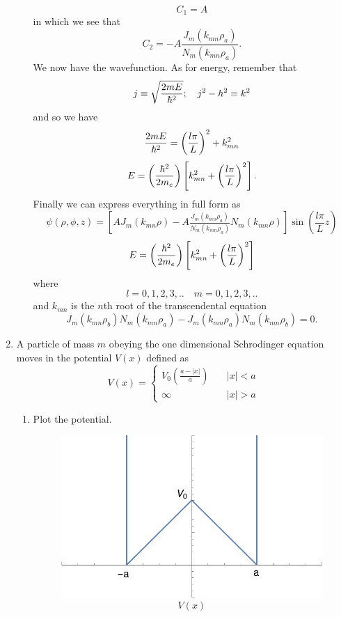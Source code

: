 \documentclass[11pt,letterpaper]{article}
\begin{document}
\begin{enumerate}
\begin{enumerate}
$$C_1 = A$$ 
in which we see that
$$C_2 = -A\frac{J_m(k_{mn}\rho_a)}{N_m(k_{mn}\rho_a)}.$$
We now have the wavefunction. As for energy, remember that
$$j\equiv\sqrt{\frac{2mE}{\hbar^2}};\quad j^2-h^2 = k^2$$
and so we have
$$\frac{2mE}{\hbar^2} = \left(\frac{l\pi }{L}\right)^2+k_{mn}^2$$
$$ E = \left(\frac{\hbar^2}{2m_e}\right)\left[k_{mn}^2+\left(\frac{l\pi}{L}\right)^2\right].$$
Finally we can express everything in full form as 
$$\psi(\rho,\phi,z) = \left[AJ_m(k_{mn}\rho)-A\tfrac{J_m(k_{mn}\rho_a)}{N_m(k_{mn}\rho_a)}N_m(k_{mn}\rho)\right]\sin\left(\frac{l\pi}{L}z\right)$$
$$ E = \left(\frac{\hbar^2}{2m_e}\right)\left[k_{mn}^2+\left(\frac{l\pi}{L}\right)^2\right]$$
where 
$$l=0,1,2,3,..\quad m=0,1,2,3,..$$
and $k_{mn}$ is the $n$th root of the transcendental equation
$$J_m(k_{mn}\rho_b)N_m(k_{mn}\rho_a)-J_m(k_{mn}\rho_a)N_m(k_{mn}\rho_b) = 0.$$
\end{enumerate}
\item A particle of mass $m$ obeying the one dimensional Schrodinger equation moves in the potential $V(x)$ defined as
\begin{equation}\label{7}V(x) =\begin{cases}V_0\left(\frac{a-|x|}{a}\right)&\quad |x|<a\\\infty&\quad|x|>a\end{cases}\end{equation}
\begin{enumerate}
\item Plot the potential.
\begin{figure}[H]
\centering
\includegraphics[width=100mm]{HW3_5a.pdf}
$$V(x)$$


\end{figure}
\end{enumerate}
\end{enumerate}
\end{document}
